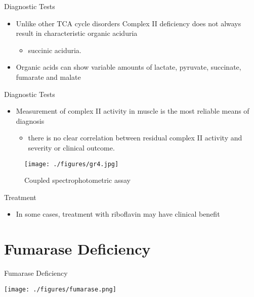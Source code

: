 \documentclass[presentation, smaller]{beamer}
\begin{document}
\begin{frame}[label={sec:org5e0f7b5}]{Diagnostic Tests}
\begin{itemize}
\item Unlike other TCA cycle disorders Complex II deficiency does not always
result in characteristic organic aciduria
\begin{itemize}
\item succinic aciduria.
\end{itemize}
\item Organic acids can show variable amounts of lactate, pyruvate, succinate, fumarate and malate
\end{itemize}
\end{frame}

\begin{frame}[label={sec:orgcad0c27}]{Diagnostic Tests}
\begin{itemize}
\item Measurement of complex II activity in muscle is the most reliable
means of diagnosis
\begin{itemize}
\item there is no clear correlation between residual complex II activity
and severity or clinical outcome.
\end{itemize}
\end{itemize}

\begin{figure}[htbp]
\centering
\texttt{[image: ./figures/gr4.jpg]}
\caption{\label{fig:org8cf1825}
Coupled spectrophotometric assay}
\end{figure}
\end{frame}

\begin{frame}[label={sec:orga920634}]{Treatment}
\begin{itemize}
\item In some cases, treatment with riboflavin may have clinical benefit
\end{itemize}
\end{frame}

\section{Fumarase Deficiency}
\label{sec:org2a7bdde}
\begin{frame}[label={sec:orgcd5b881}]{Fumarase Deficiency}
\begin{center}
\texttt{[image: ./figures/fumarase.png]}
\end{center}
\end{frame}
\end{document}
